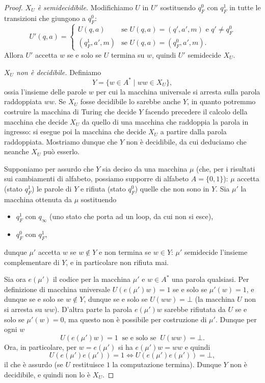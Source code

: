 \begin{proof}
\emph{$X_U$ è semidecidibile.} Modifichiamo $U$ in $U'$ sostituendo $q_F^0$ con $q_F^1$ in tutte le transizioni che giungono a $q_F^0$:
\[
U'(q,a)=
\begin{cases}
U(q,a) & \text{se } U(q,a)=(q',a',m)\text{ e }q'\neq q_F^0\\
(q_F^1,a',m) & \text{se } U(q,a)=(q_F^0,a',m).
\end{cases}
\]
Allora $U'$ accetta $w$ se e solo se $U$ termina su $w$, quindi $U'$ semidecide $X_U$.

\emph{$X_U$ non è decidibile.} Definiamo
\[
Y=\{w\in A^*\mid ww\in X_U\},
\]
ossia l'insieme delle parole $w$ per cui la macchina universale si arresta sulla parola raddoppiata $ww$.
Se $X_U$ fosse decidibile lo sarebbe anche $Y$, in quanto potremmo costruire la macchina di Turing che decide $Y$ facendo precedere il calcolo della macchina che decide $X_U$ da quello di una macchina che raddoppia la parola in ingresso: si esegue poi la macchina che decide $X_U$ a partire dalla parola raddoppiata. Mostriamo dunque che $Y$ non è decidibile, da cui deduciamo che neanche $X_U$ può esserlo.

Supponiamo per assurdo che $Y$ sia deciso da una macchina $\mu$ (che, per i risultati sui cambiamenti di alfabeto, possiamo supporre di alfabeto $A=\{0,1\}$): $\mu$ accetta (stato $q_F^1$) le parole di $Y$ e rifiuta (stato $q_F^0$) quelle che non sono in $Y$. Sia $\mu'$ la macchina ottenuta da $\mu$ sostituendo
\begin{itemize}
\item $q_F^1$ con $q_\infty$ (uno stato che porta ad un loop, da cui non si esce),
\item $q_F^0$ con $q_F^1$,
\end{itemize}
dunque $\mu'$ accetta $w$ se $w\notin Y$ e non termina se $w\in Y$: $\mu'$ semidecide l'insieme complementare di $Y$, e in particolare non rifiuta mai.

Sia ora $e(\mu')$ il codice per la macchina $\mu'$ e $w\in A^*$ una parola qualsiasi. Per definizione di macchina universale $U(e(\mu')w)=1$ se e solo se $\mu'(w)=1$, e dunque se e solo se $w\notin Y$, dunque se e solo se $U(ww)=\bot$ (la macchina $U$ non si arresta su $ww$).
D'altra parte la parola $e(\mu')w$ sarebbe rifiutata da $U$ se e solo se $\mu'(w)=0$, ma questo non è possibile per costruzione di $\mu'$. Dunque per ogni $w$
\[
\boxed{U(e(\mu')w)=1\ \text{ se e solo se }\ U(ww)=\bot.}
\]
Ora, in particolare, per $w=e(\mu')$ si ha $e(\mu')w=ww$ e quindi
\[
U(e(\mu')e(\mu'))=1\iff U(e(\mu')e(\mu'))=\bot,
\]
il che è assurdo (se $U$ restituisce $1$ la computazione termina). Dunque $Y$ non è decidibile, e quindi non lo è $X_U$.
\end{proof}

